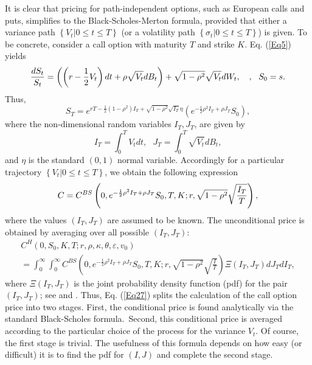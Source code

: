 \documentclass{article}
\begin{document}
It is clear that pricing for path-independent options, such as European
calls and puts, simplifies to the Black-Scholes-Merton formula, provided
that either a variance path $\left\{ \left. V_{t}\right\vert 0\leq t\leq
T\right\} $ (or a volatility path $\left\{ \left. \sigma _{t}\right\vert
0\leq t\leq T\right\} $) is given. To be concrete, consider a call option
with maturity $T$ and strike $K$. Eq. (\ref{Eq5}) yields 
\begin{equation}
\frac{dS_{t}}{S_{t}}=\left( \left( r-\frac{1}{2}V_{t}\right) dt+\rho \sqrt{%
V_{t}}dB_{t}\right) +\sqrt{1-\rho ^{2}}\sqrt{V_{t}}dW_{t},\ \ \ ,\ \ S_{0}=s.
\label{Eq23}
\end{equation}%
Thus,%
\begin{equation}
S_{T}=e^{rT-\frac{1}{2}\left( 1-\rho ^{2}\right) I_{T}+\sqrt{1-\rho ^{2}}%
\sqrt{I_{T}}\eta }\left( e^{-\frac{1}{2}\rho ^{2}I_{T}+\rho
J_{T}}S_{0}\right) ,  \label{Eq24}
\end{equation}%
where the non-dimensional random variables $I_{T},J_{T}$, are given by%
\begin{equation}
I_{T}=\int_{0}^{T}V_{t}dt,\ \ \ J_{T}=\int_{0}^{T}\sqrt{V_{t}}dB_{t},
\label{Eq25}
\end{equation}%
and $\eta $ is the standard $\left( 0,1\right) $ normal variable.
Accordingly for a particular trajectory $\left\{ \left. V_{t}\right\vert
0\leq t\leq T\right\} $, we obtain the following expression%
\begin{equation}
C=C^{BS}\left( 0,e^{-\frac{1}{2}\rho ^{2}I_{T}+\rho J_{T}}S_{0},T,K;r,\sqrt{%
1-\rho ^{2}}\sqrt{\frac{I_{T}}{T}}\right) ,  \label{Eq26}
\end{equation}%
where the values $\left( I_{T},J_{T}\right) $ are assumed to be known. The
unconditional price is obtained by averaging over all possible $\left(
I_{T},J_{T}\right) $:%
\begin{equation}
\begin{array}{c}
C^{H}\left( 0,S_{0},K,T;r,\rho ,\kappa ,\theta ,\varepsilon ,v_{0}\right) \\ 
=\int_{0}^{\infty }\int_{0}^{\infty }C^{BS}\left( 0,e^{-\frac{1}{2}\rho
^{2}I_{T}+\rho J_{T}}S_{0},T,K;r,\sqrt{1-\rho ^{2}}\sqrt{\frac{I}{T}}\right)
\Xi \left( I_{T},J_{T}\right) dJ_{T}dI_{T},%
\end{array}
\label{Eq27}
\end{equation}%
where $\Xi \left( I_{T},J_{T}\right) $ is the joint probability density
function (pdf) for the pair $\left( I_{T},J_{T}\right) $; see \cite%
{Willard1997} and \cite{Romano1997}. Thus, Eq. (\ref{Eq27}) splits the
calculation of the call option price into two stages. First, the conditional
price is found analytically via the standard Black-Scholes formula.\ Second,
this conditional price is averaged according to the particular choice of the
process for the variance $V_{t}$. Of course, the first stage is trivial. The
usefulness of this formula depends on how easy (or difficult) it is to find
the pdf for $\left( I,J\right) $ and complete the second stage.
\end{document}
